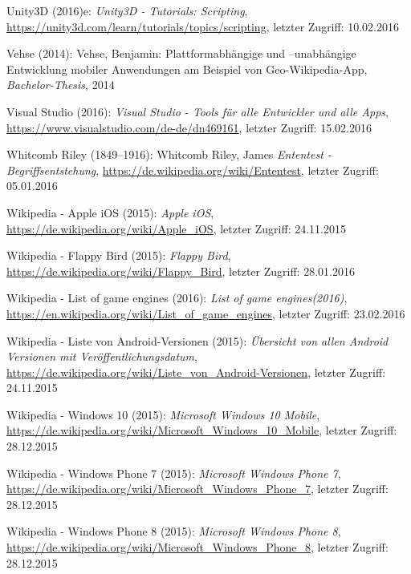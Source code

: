 \begin{thebibliography}{}
Unity3D (2016)e: \emph{Unity3D - Tutorials: Scripting},
\url{https://unity3d.com/learn/tutorials/topics/scripting}, letzter Zugriff: 10.02.2016

Vehse (2014): Vehse, Benjamin:
\glqq Plattformabhängige und –unabhängige
Entwicklung mobiler Anwendungen am
Beispiel von Geo-Wikipedia-App\grqq, 
\emph{Bachelor-Thesis}, 2014

Visual Studio (2016): \emph{Visual Studio - Tools für alle Entwickler und alle Apps},
\url{https://www.visualstudio.com/de-de/dn469161}, letzter Zugriff: 15.02.2016

Whitcomb Riley (1849–1916): Whitcomb Riley, James \emph{Ententest - Begriffsentstehung},
\url{https://de.wikipedia.org/wiki/Ententest}, letzter Zugriff: 05.01.2016

Wikipedia - Apple iOS (2015): \emph{Apple iOS},
\url{https://de.wikipedia.org/wiki/Apple_iOS}, letzter Zugriff: 24.11.2015

Wikipedia - Flappy Bird (2015): \emph{Flappy Bird},
\url{https://de.wikipedia.org/wiki/Flappy_Bird}, letzter Zugriff: 28.01.2016

Wikipedia - List of game engines (2016): \emph{List of game engines(2016)},
\url{https://en.wikipedia.org/wiki/List_of_game_engines}, letzter Zugriff: 23.02.2016

Wikipedia - Liste von Android-Versionen (2015): \emph{Übersicht von allen Android Versionen mit Veröffentlichungsdatum},
\url{https://de.wikipedia.org/wiki/Liste_von_Android-Versionen}, letzter Zugriff: 24.11.2015

Wikipedia - Windows 10 (2015): \emph{Microsoft Windows 10 Mobile},
\url{https://de.wikipedia.org/wiki/Microsoft_Windows_10_Mobile}, letzter Zugriff: 28.12.2015

Wikipedia - Windows Phone 7 (2015): \emph{Microsoft Windows Phone 7},
\url{https://de.wikipedia.org/wiki/Microsoft_Windows_Phone_7}, letzter Zugriff: 28.12.2015

Wikipedia - Windows Phone 8 (2015): \emph{Microsoft Windows Phone 8},
\url{https://de.wikipedia.org/wiki/Microsoft_Windows_Phone_8}, letzter Zugriff: 28.12.2015


\end{thebibliography}
